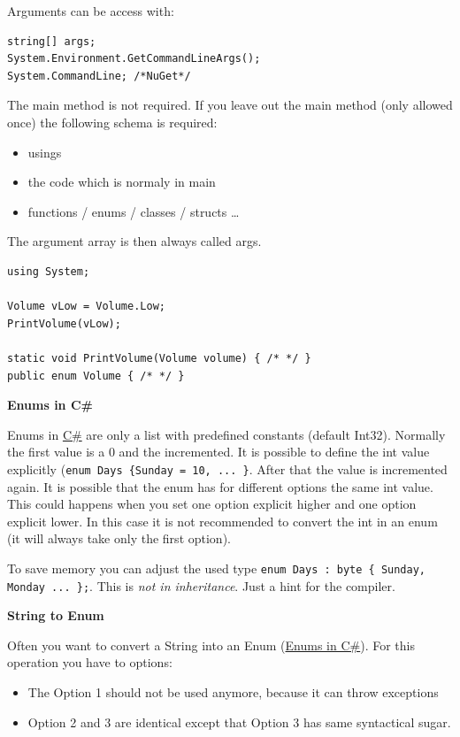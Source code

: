 \documentclass[11pt,twoside,landscape]{article}
\begin{document}
\begin{multicols}{3}
Arguments can be access with:
\lstset{language=csharp,label= ,caption= ,captionpos=b,numbers=none}
\begin{lstlisting}
string[] args;
System.Environment.GetCommandLineArgs();
System.CommandLine; /*NuGet*/
\end{lstlisting}


The main method is not required.
If you leave out the main method (only allowed once) the following schema is required:
\begin{itemize}
\item usings
\item the code which is normaly in main
\item functions / enums / classes / structs \ldots{}
\end{itemize}


The argument array is then always called args.

\lstset{language=csharp,label= ,caption= ,captionpos=b,numbers=none}
\begin{lstlisting}
using System;

Volume vLow = Volume.Low;
PrintVolume(vLow);

static void PrintVolume(Volume volume) { /* */ }
public enum Volume { /* */ }
\end{lstlisting}

\textbf{Enums in C\#}

Enums in \href{../../../roam/20211003114158-c.org}{C\#} are only a list with predefined constants (default Int32).
Normally the first value is a 0 and the incremented.
It is possible to define the int value explicitly (\texttt{enum Days \{Sunday = 10, ... \}}.
After that the value is incremented again.
It is possible that the enum has for different options the same int value.
This could happens when you set one option explicit higher and one option explicit lower.
In this case it is not recommended to convert the int in an enum (it will always take only the first option).

To save memory you can adjust the used type \texttt{enum Days : byte \{ Sunday, Monday ... \};}.
This is \emph{not in inheritance}. Just a hint for the compiler.

\textbf{String to Enum}

Often you want to convert a String into an Enum (\href{../../../roam/20211006113326-enums_in_c.org}{Enums in C\#}).
For this operation you have to options:
\begin{itemize}
\item The Option 1 should not be used anymore, because it can throw exceptions
\item Option 2 and 3 are identical except that Option 3 has same syntactical sugar.
\end{itemize}


\end{multicols}
\end{document}
